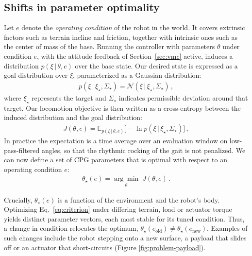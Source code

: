 \documentclass[letterpaper, 10 pt, conference]{ieeeconf}  %
\newcommand{\given}[1][]{\,#1\vert\,}
\begin{document}

\subsection{Shifts in parameter optimality}
\label{sec:optimality-shift}

Let $e$ denote the \emph{operating condition} of the robot in the world.
It covers extrinsic factors such as terrain incline and friction, together with intrinsic ones such as the center of mass of the base.
Running the controller with parameters $\theta$ under condition $e$, with the attitude feedback of Section~\ref{sec:vmc} active, induces a distribution $p(\xi \given \theta, e)$ over the base state. Our desired state is expressed as a goal distribution over $\xi$, parameterized as a Gaussian distribution:
\begin{align} \label{eq:goal-prior}
	p(\xi \given \xi_{\star}, \Sigma_{\star}) = \mathcal{N}(\xi \given \xi_{\star}, \Sigma_{\star}) \, ,
\end{align}
where $\xi_{\star}$ represents the target and $\Sigma_{\star}$ indicates permissible deviation around that target. 
Our locomotion objective is then written as a cross-entropy between the induced distribution and the goal distribution:
\begin{align}
    J(\theta, e) =  \mathbb{E}_{p(\xi \given \theta, e)} \Big[ -\ln p(\xi \given \xi_{\star}, \Sigma_{\star}) \Big] \, ,
    \label{eq:criterion}
\end{align}
In practice the expectation is a time average over an evaluation window on low-pass-filtered angles, so that the rhythmic rocking of the gait is not penalized.
We can now define a set of CPG parameters that is optimal with respect to an operating condition $e$:
\begin{align}
    \theta_{\star}(e) = \underset{\theta}{\arg \min}\; J(\theta, e) \,.
    \label{eq:terrain-optimum}
\end{align}

Crucially, $\theta_{\star}(e)$ is a function of the environment and the robot's body.
Optimizing Eq.~\ref{eq:criterion} under differing terrain, load or actuator torque yields distinct parameter vectors, each most stable for its tuned condition. Thus, a change in condition relocates the optimum, $ \theta_{\star}(e_{\text{old}}) \neq \theta_{\star}(e_{\text{new}})$.
Examples of such changes include the robot stepping onto a new surface, a payload that slides off or an actuator that short-circuits (Figure \ref{fig:problem-payload}).
\end{document}
